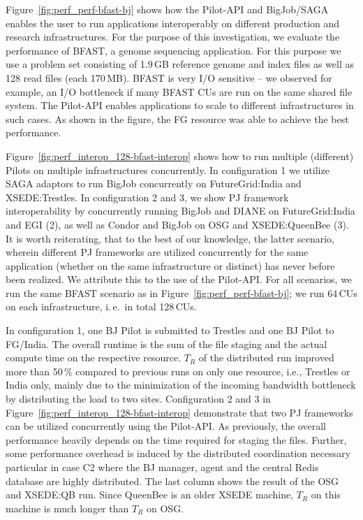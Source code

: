 \documentclass[]{paper}
\begin{document}
Figure~\ref{fig:perf_perf-bfast-bj} shows how the Pilot-API and BigJob/SAGA
enables the user to run applications interoperably on different production and
research infrastructures. For the purpose of this
investigation, we evaluate the performance of BFAST, a genome sequencing
application. For this purpose we use a problem set consisting of 1.9\,GB
reference genome and index files as well as 128 read files (each 170\,MB).
BFAST is very I/O sensitive -- we observed for example, an I/O bottleneck if
many BFAST CUs are run on the same shared file system. The Pilot-API enables
applications to scale to different infrastructures in such cases. As shown in
the figure, the FG resource was able to achieve the best performance.


Figure~\ref{fig:perf_interop_128-bfast-interop} shows how to run multiple
(different) Pilots on multiple infrastructures concurrently. In configuration
1 we utilize SAGA adaptors to run BigJob concurrently on FutureGrid:India and
XSEDE:Trestles. In configuration 2 and 3, we show PJ framework
interoperability by concurrently running BigJob and DIANE on FutureGrid:India
and EGI (2), as well as Condor and BigJob on OSG and XSEDE:QueenBee (3). It is
worth reiterating, that to the best of our knowledge, the latter scenario,
wherein different PJ frameworks are utilized concurrently for the same
application (whether on the same infrastructure or distinct) has never before
been realized. We attribute this to the use of the Pilot-API. For all
scenarios, we run the same BFAST scenario as in
Figure~\ref{fig:perf_perf-bfast-bj}; we run 64\,CUs on each infrastructure,
i.\,e.\ in total 128\,CUs.

In configuration 1, one BJ Pilot is submitted to Trestles and one BJ Pilot to
FG/India. The overall runtime is the sum of the file staging and the actual
compute time on the respective resource. $T_R$ of the distributed run improved
more than 50\,\% compared to previous runs on only one resource, i.e.,
Trestles or India only, mainly due to the minimization of the incoming
bandwidth bottleneck by distributing the load to two sites. Configuration 2
and 3 in Figure~\ref{fig:perf_interop_128-bfast-interop} demonstrate that two
PJ frameworks can be utilized concurrently using the Pilot-API. As previously,
the overall performance heavily depends on the time required for staging the
files. Further, some performance overhead is induced by the distributed
coordination necessary particular in case C2 where the BJ manager, agent and
the central Redis database are highly distributed. The last column shows the
result of the OSG and XSEDE:QB run. Since QueenBee is an older XSEDE machine,
$T_R$ on this machine is much longer than $T_R$ on OSG.
\end{document}
